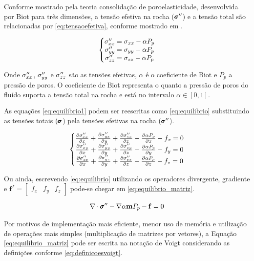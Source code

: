 Conforme mostrado pela teoria consolidação de poroelasticidade, desenvolvida por Biot para três dimensões, a tensão efetiva na rocha ($\pmb{\sigma}^{\prime\prime}$) e a tensão total são relacionadas por \eqref{eq:tensaoefetiva}, conforme mostrado em \citet{ResGeomec}.


\begin{equation}
\label{eq:tensaoefetiva}
\left\{\begin{matrix}
 \sxx = \stxx - \alpha P_p \\
 \syy = \styy - \alpha P_p \\
 \szz = \stzz - \alpha P_p
\end{matrix}\right.
\end{equation}


Onde $\sigma^{\prime\prime}_{xx}$, $\sigma^{\prime\prime}_{yy}$  e $\sigma^{\prime\prime}_{zz}$ são as tensões efetivas, $\alpha$ é o coeficiente de Biot e $P_p$ a pressão de poros. O coeficiente de Biot representa o quanto a pressão de poros do fluído suporta a tensão total na rocha e está no intervalo $\alpha \in [0,1]$.

As equações \eqref{eq:equilibrio1} podem ser reescritas como \eqref{eq:equilibrio} substituindo as tensões totais ($\pmb{\sigma}$) pela tensões efetivas na rocha ($\pmb{\sigma}^{\prime\prime}$).

\begin{equation}
\label{eq:equilibrio}
\left\{\begin{matrix}
\dx[\sxx]  + \dy[\syx] + \dz[\szx] - \dx[\alpha P_p] - f_x   = 0
\\
\dx[\sxy]  + \dy[\syy] + \dz[\szy] - \dy[\alpha P_p] - f_y   = 0
\\
\dx[\sxz]  + \dy[\syz] + \dz[\szz] - \dz[\alpha P_p] - f_z   = 0
\end{matrix}\right.
\end{equation}

Ou ainda, escrevendo \eqref{eq:equilibrio} utilizando os operadores divergente, gradiente e $\mathbf{f}^T=\begin{bmatrix}f_x & f_y & f_z\end{bmatrix}$ pode-se chegar em
\eqref{eq:equilibrio_matriz}.

\begin{equation}
\label{eq:equilibrio_matriz}
\nabla \cdot \stef - \nabla \alpha \mathbf{m} P_p - \mathbf{f} = 0
\end{equation}

Por motivos de implementação mais eficiente, menor uso de memória e utilização de operações mais simples (multiplicação de matrizes por vetores), a Equação \eqref{eq:equilibrio_matriz} pode ser escrita na notação de Voigt considerando as definições conforme \eqref{eq:definicoesvoigt}.

